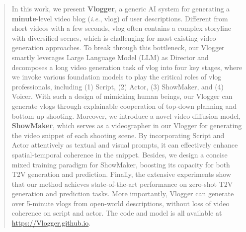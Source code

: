 \begin{abstract}

In this work,
we present \textbf{Vlogger},
a generic AI system for generating a \textbf{minute}-level video blog (\textit{i.e.}, vlog) of user descriptions.
Different from short videos with a few seconds,
vlog often contains a complex storyline with diversified scenes,
which is challenging for most existing video generation approaches.
To break through this bottleneck,
our Vlogger smartly leverages Large Language Model (LLM) as Director
and decomposes a long video generation task of vlog into four key stages,
where we invoke various foundation models to play the critical roles of vlog professionals,
including 
(1) Script,
(2) Actor,
(3) ShowMaker,
and 
(4) Voicer.
With such a design of mimicking human beings,
our Vlogger can generate vlogs through explainable cooperation of top-down planning and bottom-up shooting. 
Moreover,
we introduce a novel video diffusion model,
\textbf{ShowMaker},
which serves as a videographer in our Vlogger for generating the video snippet of each shooting scene.
By incorporating Script and Actor attentively as textual and visual prompts,
it can effectively enhance spatial-temporal coherence in the snippet. 
Besides,
we design a concise mixed training paradigm for ShowMaker,
boosting its capacity for both T2V generation and prediction.
Finally,
the extensive experiments show that
our method achieves state-of-the-art performance on zero-shot T2V generation and prediction tasks.
More importantly,
Vlogger can generate over
5-minute
vlogs from open-world descriptions,
without loss of video coherence on script and actor.
The code and model is all available at \href{https://github.com/zhuangshaobin/Vlogger}{https://Vlogger.github.io}.

\end{abstract}